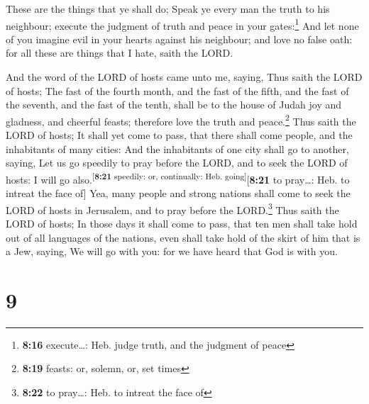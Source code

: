  These are the things that ye shall do; Speak ye every
man the truth to his neighbour; execute the judgment of truth and peace
in your gates:\footnote{\textbf{8:16} execute\ldots: Heb. judge truth,
  and the judgment of peace}  And let none of you imagine
evil in your hearts against his neighbour; and love no false oath: for
all these are things that I hate, saith the LORD.

 And the word of the LORD of hosts came unto me, saying,
 Thus saith the LORD of hosts; The fast of the fourth
month, and the fast of the fifth, and the fast of the seventh, and the
fast of the tenth, shall be to the house of Judah joy and gladness, and
cheerful feasts; therefore love the truth and peace.\footnote{\textbf{8:19}
  feasts: or, solemn, or, set times}  Thus saith the LORD
of hosts; It shall yet come to pass, that there shall come people, and
the inhabitants of many cities:  And the inhabitants of
one city shall go to another, saying, Let us go speedily to pray before
the LORD, and to seek the LORD of hosts: I will go
also.\textsuperscript{{[}\textbf{8:21} speedily: or, continually: Heb.
going{]}}{[}\textbf{8:21} to pray\ldots: Heb. to intreat the face of{]}
 Yea, many people and strong nations shall come to seek
the LORD of hosts in Jerusalem, and to pray before the LORD.\footnote{\textbf{8:22}
  to pray\ldots: Heb. to intreat the face of}  Thus saith
the LORD of hosts; In those days it shall come to pass, that ten men
shall take hold out of all languages of the nations, even shall take
hold of the skirt of him that is a Jew, saying, We will go with you: for
we have heard that God is with you.

\hypertarget{section-8}{%
\section{9}\label{section-8}}

